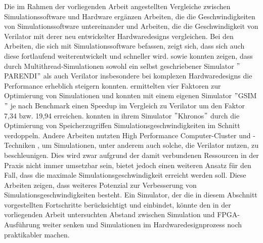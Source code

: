 Die im Rahmen der vorliegenden Arbeit angestellten Vergleiche zwischen Simulationssoftware und Hardware ergänzen Arbeiten, die die Geschwindigkeiten von Simulationssoftware untereinander \parencite{chen2025gsim, choi2020flash, emami2025parendi, hannemann2025verilator, lopez2023fast, zhou2023khronos}
und Arbeiten, die die Geschwindigkeit von Verilator mit derer neu entwickelter Hardwaredesigns \parencite{emami2024highly, qin2025feriver} vergleichen.
Bei den Arbeiten, die sich mit Simulationssoftware befassen, zeigt sich, dass sich auch diese fortlaufend weiterentwickelt und schneller wird.
\textcite{emami2024highly} sowie \textcite{emami2025parendi} konnten zeigen, dass durch Multithread-Simulationen sowohl ein selbst geschriebener Simulator \("\)PARENDI\("\) als auch Verilator insbesondere bei komplexen Hardwaredesigns die Performance erheblich steigern konnten.
\textcite{chen2025gsim} ermittelten vier Faktoren zur Optimierung von Simulationen und konnten mit einem eigenen Simulator \("\)GSIM\("\) je nach Benchmark einen Speedup im Vergleich zu Verilator um den Faktor 7,34 bzw. 19,94 erreichen.
\textcite{zhou2023khronos} konnten in ihrem Simulator \("\)Khronos\("\) durch die Optimierung von Speicherzugriffen Simulationsgeschwindigkeiten im Schnitt verdoppeln.
Andere Arbeiten nutzten High Performance Computer-Cluster und -Techniken \parencite{hannemann2025verilator, lopez2023fast}, um Simulationen, unter anderem auch solche, die Verilator nutzen, zu beschleunigen.
Dies wird zwar aufgrund der damit verbundenen Ressourcen in der Praxis nicht immer umsetzbar sein, bietet jedoch einen weiteren Ansatz für den Fall, dass die maximale Simulationsgeschwindigkeit erreicht werden soll.
Diese Arbeiten zeigen, dass weiteres Potenzial zur Verbesserung von Simulationsgeschwindigkeiten besteht.
Ein Simulator, der die in diesem Abschnitt vorgestellten Fortschritte berücksichtigt und einbindet, könnte den in der vorliegenden Arbeit untersuchten Abstand zwischen Simulation und FPGA-Ausführung weiter senken und Simulationen im Hardwaredesignprozess noch praktikabler machen.